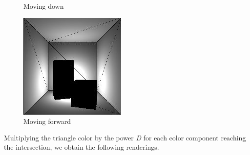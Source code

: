 \begin{figure}[H]
    \caption{Moving down}
\endminipage\hfill
{}
    \centering
    \includegraphics[width=\linewidth]{img/light3.jpg}
    \caption{Moving forward}
\endminipage\hfill
\end{figure}

Multiplying the triangle color by the power \textit{D} for each color component reaching the intersection, we obtain the following renderings.


